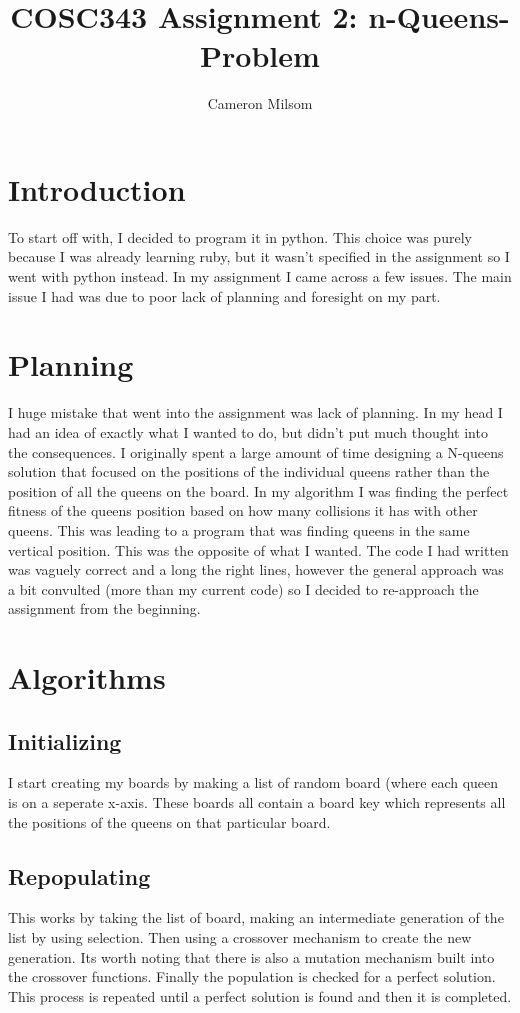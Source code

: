 \documentclass[a4paper,11pt]{article}
\title{COSC343 Assignment 2: n-Queens-Problem}
\author{Cameron Milsom}
\begin{document}
\maketitle

\section{Introduction}
To start off with, I decided to program it in python. This choice was purely because I was already learning ruby, but it wasn't specified in the assignment so I went with python instead.
In my assignment I came across a few issues. The main issue I had was due to poor lack of planning and foresight on my part.


\section{Planning}
I huge mistake that went into the assignment was lack of planning. In my head I had an idea of exactly what I wanted to do, but didn't put much thought into the consequences.
I originally spent a large amount of time designing a N-queens solution that focused on the positions of the individual queens rather than the position of all the queens on the board.
In my algorithm I was finding the perfect fitness of the queens position based on how many collisions it has with other queens. This was leading to a program that was finding queens in the same vertical position. This was the opposite of what I wanted.
The code I had written was vaguely correct and a long the right lines, however the general approach was a bit convulted (more than my current code) so I decided to re-approach the assignment from the beginning. 

\section*{Algorithms}

\subsection*{Initializing}
I start creating my boards by making a list of random board (where each queen is on a seperate x-axis. These boards all contain a board key which represents all the positions of the queens on that particular board.

\subsection*{Repopulating}
This works by taking the list of board, making an intermediate generation of the list by using selection. Then using a crossover mechanism to create the new generation.
Its worth noting that there is also a mutation mechanism built into the crossover functions.
Finally the population is checked for a perfect solution. This process is repeated until a perfect solution is found and then it is completed.
\end{document}
